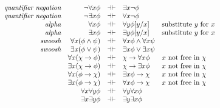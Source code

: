 \[ \begin{array}{>{\raggedleft\it}p{4cm} r c l p{6cm}}
 quantifier negation & \neg\forall x\phi & \dashv\vdash & \exists x\neg \phi & \\
quantifier negation  & \neg\exists x\phi & \dashv\vdash & \forall x\neg \phi &  \\
alpha &  \forall x\phi & \dashv\vdash & \forall y\phi [y/x] & substitute $y$ for $x$ \\
alpha &  \exists x\phi & \dashv\vdash & \exists y\phi [y/x] & substitute $y$ for $x$ \\ 
swoosh & \forall x(\phi\wedge \psi ) & \dashv\vdash & \forall x\phi\wedge \forall x\psi &  \\
swoosh & \exists x(\phi\vee\psi )   & \dashv\vdash & \exists x\phi\vee\exists x\psi & \\
       & \forall x(\chi \to \phi)     & \dashv\vdash & \chi\to\forall x\phi & $x$ not free in $\chi$ \\
       & \exists x(\chi\to \phi )     & \dashv\vdash & \chi \to\exists x\phi & $x$ not free in $\chi$ \\
       & \forall x(\phi\to \chi )     & \dashv\vdash & \exists x\phi\to \chi & $x$ not free in $\chi$ \\
       & \exists x(\phi\to \chi )     & \dashv\vdash & \forall x\phi\to \chi & $x$ not free in $\chi$ \\
       & \forall x\forall y\phi  & \dashv\vdash & \forall y\forall x\phi \\
       & \exists x\exists y\phi  & \dashv\vdash & \exists y\exists x\phi                                                          
\end{array} \]
 


%







